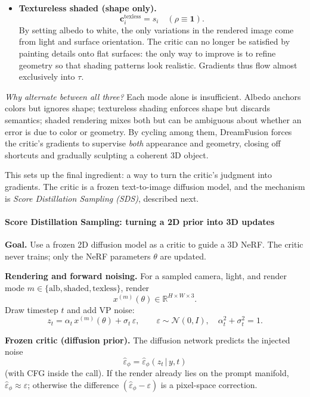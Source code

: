 \begin{enrichment}
\begin{enrichment}
\begin{itemize}
            \item \textbf{Textureless shaded (shape only).}
            \[
            \mathbf{c}_i^{\text{texless}} = s_i \quad (\rho \equiv \mathbf{1}).
            \]
            By setting albedo to white, the only variations in the rendered image come from light and surface orientation. The critic can no longer be satisfied by painting details onto flat surfaces: the only way to improve is to refine geometry so that shading patterns look realistic. Gradients thus flow almost exclusively into \(\tau\).
        \end{itemize}
        
        \noindent
        \emph{Why alternate between all three?} Each mode alone is insufficient. Albedo anchors colors but ignores shape; textureless shading enforces shape but discards semantics; shaded rendering mixes both but can be ambiguous about whether an error is due to color or geometry. By cycling among them, DreamFusion forces the critic’s gradients to supervise \emph{both} appearance and geometry, closing off shortcuts and gradually sculpting a coherent 3D object.
        
        \medskip
        This sets up the final ingredient: a way to turn the critic’s judgment into gradients. The critic is a frozen text-to-image diffusion model, and the mechanism is \emph{Score Distillation Sampling (SDS)}, described next.
        
        \paragraph{Score Distillation Sampling: turning a 2D prior into 3D updates}
        \label{par:chapter23_dreamfusion_sds}
        
        \textbf{Goal.} Use a frozen 2D diffusion model as a critic to guide a 3D NeRF. The critic never trains; only the NeRF parameters \(\theta\) are updated.
        
        \medskip
        \noindent
        \textbf{Rendering and forward noising.}
        For a sampled camera, light, and render mode \(m\in\{\text{alb},\text{shaded},\text{texless}\}\), render
        \[
        x^{(m)}(\theta)\in\mathbb{R}^{H\times W\times 3}.
        \]
        Draw timestep \(t\) and add VP noise:
        \[
        z_t=\alpha_t\,x^{(m)}(\theta)+\sigma_t\,\varepsilon,\qquad
        \varepsilon\sim\mathcal{N}(0,I),\quad \alpha_t^2+\sigma_t^2=1.
        \]
        
        \medskip
        \noindent
        \textbf{Frozen critic (diffusion prior).}
        The diffusion network predicts the injected noise
        \[
        \hat{\varepsilon}_\phi=\hat{\varepsilon}_\phi(z_t\,|\,y,t)
        \]
        (with CFG inside the call). If the render already lies on the prompt manifold, \(\hat{\varepsilon}_\phi\approx\varepsilon\); otherwise the difference \((\hat{\varepsilon}_\phi-\varepsilon)\) is a pixel-space correction.
        

\end{enrichment}
\end{enrichment}
